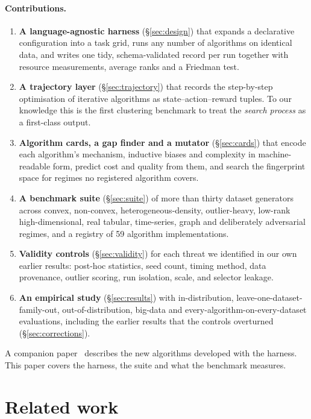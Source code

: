\documentclass[11pt,a4paper]{article}
\begin{document}
\paragraph{Contributions.}
\begin{enumerate}
  \item \textbf{A language-agnostic harness} (\S\ref{sec:design}) that expands
  a declarative configuration into a task grid, runs any number of algorithms
  on identical data, and writes one tidy, schema-validated record per run
  together with resource measurements, average ranks and a Friedman test.
  \item \textbf{A trajectory layer} (\S\ref{sec:trajectory}) that records the
  step-by-step optimisation of iterative algorithms as state--action--reward
  tuples. To our knowledge this is the first clustering benchmark to treat the
  \emph{search process} as a first-class output.
  \item \textbf{Algorithm cards, a gap finder and a mutator}
  (\S\ref{sec:cards}) that encode each algorithm's mechanism, inductive biases
  and complexity in machine-readable form, predict cost and quality from them,
  and search the fingerprint space for regimes no registered algorithm covers.
  \item \textbf{A benchmark suite} (\S\ref{sec:suite}) of more than thirty
  dataset generators across convex, non-convex, heterogeneous-density,
  outlier-heavy, low-rank high-dimensional, real tabular, time-series, graph
  and deliberately adversarial regimes, and a registry of 59 algorithm
  implementations.
  \item \textbf{Validity controls} (\S\ref{sec:validity}) for each threat we
  identified in our own earlier results: post-hoc statistics, seed count,
  timing method, data provenance, outlier scoring, run isolation, scale, and
  selector leakage.
  \item \textbf{An empirical study} (\S\ref{sec:results}) with
  in-distribution, leave-one-dataset-family-out, out-of-distribution,
  big-data and every-algorithm-on-every-dataset evaluations, including the
  earlier results that the controls overturned (\S\ref{sec:corrections}).
\end{enumerate}
A companion paper~\cite{clustbenchalgos} describes the new algorithms
developed with the harness. This paper covers the harness, the suite and what
the benchmark measures.

\section{Related work}
\end{document}
